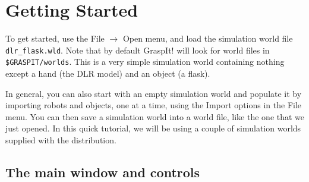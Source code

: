 \section{Getting Started}


\newcommand{\myimg}[1]{\texorhtml{\texttt{[image: ../images/\#1]}}{\htmlimg{../images/#1}}\ }

To get started, use the File $\rightarrow$ Open menu, and load the
simulation world file \texttt{dlr\_flask.wld}. Note that by default
GraspIt!  will look for world files in \texttt{\$GRASPIT/worlds}. This
is a very simple simulation world containing nothing except a hand
(the DLR model) and an object (a flask).

\begin{figure}[h]
{
}
\end{figure}

In general, you can also start with an empty simulation world and
populate it by importing robots and objects, one at a time, using the
Import options in the File menu. You can then save a simulation world
into a world file, like the one that we just opened. In this quick
tutorial, we will be using a couple of simulation worlds supplied with
the distribution.

\subsection{The main window and controls}

